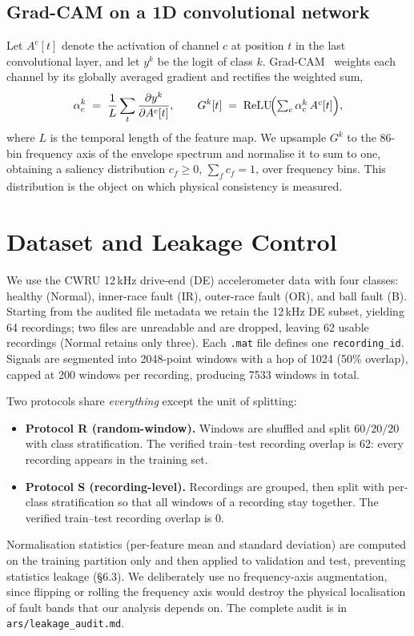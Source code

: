 \documentclass[11pt]{article}
\begin{document}
\subsection{Grad-CAM on a 1D convolutional network}
Let $A^{c}[t]$ denote the activation of channel $c$ at position $t$ in the last
convolutional layer, and let $y^{k}$ be the logit of class $k$. Grad-CAM~\cite{selvaraju2017gradcam}
weights each channel by its globally averaged gradient and rectifies the weighted sum,
\begin{equation}
\alpha^{k}_{c} \;=\; \frac{1}{L}\sum_{t} \frac{\partial y^{k}}{\partial A^{c}[t]},
\qquad
G^{k}[t] \;=\; \mathrm{ReLU}\!\Bigl(\textstyle\sum_{c} \alpha^{k}_{c}\, A^{c}[t]\Bigr),
\end{equation}
where $L$ is the temporal length of the feature map. We upsample $G^{k}$ to the 86-bin
frequency axis of the envelope spectrum and normalise it to sum to one, obtaining a
saliency distribution $c_f \ge 0$, $\sum_f c_f = 1$, over frequency bins. This distribution
is the object on which physical consistency is measured.

\section{Dataset and Leakage Control}
\label{sec:dataset}
We use the CWRU 12\,kHz drive-end (DE) accelerometer data with four classes: healthy
(Normal), inner-race fault (IR), outer-race fault (OR), and ball fault (B). Starting from
the audited file metadata we retain the 12\,kHz DE subset, yielding 64 recordings; two
files are unreadable and are dropped, leaving 62 usable recordings (Normal retains only
three). Each \texttt{.mat} file defines one \texttt{recording\_id}. Signals are segmented
into 2048-point windows with a hop of 1024 (50\% overlap), capped at 200 windows per
recording, producing 7533 windows in total.

Two protocols share \emph{everything} except the unit of splitting:
\begin{itemize}
  \item \textbf{Protocol R (random-window).} Windows are shuffled and split
  $60/20/20$ with class stratification. The verified train--test recording overlap is
  62: every recording appears in the training set.
  \item \textbf{Protocol S (recording-level).} Recordings are grouped, then split with
  per-class stratification so that all windows of a recording stay together. The verified
  train--test recording overlap is 0.
\end{itemize}
Normalisation statistics (per-feature mean and standard deviation) are computed on the
training partition only and then applied to validation and test, preventing statistics
leakage (\S6.3). We deliberately use no frequency-axis augmentation, since flipping or
rolling the frequency axis would destroy the physical localisation of fault bands that our
analysis depends on. The complete audit is in \texttt{ars/leakage\_audit.md}.
\end{document}
